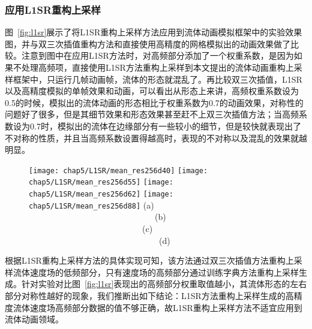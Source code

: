 \subsubsection{应用L1SR重构上采样}

图~\ref{fig:l1sr}展示了将L1SR重构上采样方法应用到流体动画模拟框架中的实验效果图，并与双三次插值重构方法和直接使用高精度的网格模拟出的动画效果做了比较。注意到图中在应用L1SR方法时，对高频部分添加了一个权重系数，是因为如果不处理高频项，直接使用L1SR方法重构上采样到本文提出的流体动画重构上采样框架中，只运行几帧动画帧，流体的形态就混乱了。再比较双三次插值，L1SR以及高精度模拟的单帧效果和动画，可以看出从形态上来讲，高频权重系数设为0.5的时候，模拟出的流体动画的形态相比于权重系数为0.7的动画效果，对称性的问题好了很多，但是其细节效果和形态效果甚至赶不上双三次插值方法；当高频系数设为0.7时，模拟出的流体在边缘部分有一些较小的细节，但是较快就表现出了不对称的性质，并且当高频系数设置得越高时，表现的不对称以及混乱的效果就越明显。

\begin{figure}[!ht]
  \centering
  \texttt{[image: chap5/L1SR/mean\_res256d40]}
  \hspace{0.1cm}
  \texttt{[image: chap5/L1SR/mean\_res256d55]}
   \hspace{0.1cm}
  \texttt{[image: chap5/L1SR/mean\_res256d62]}
   \hspace{0.1cm}
  \texttt{[image: chap5/L1SR/mean\_res256d88]}
   \newline  (a) \ \ \ \ \ \ \ \ \ \ \ \ \ \ \ \ \ \ \ \ \ \ \ \ \ \ \ \ \ \ (b) \ \ \ \ \ \ \ \ \ \ \ \ \ \ \ \ \ \ \ \ \ \ \ \ \ \ \ (c) \ \ \ \ \ \ \ \ \ \ \ \ \ \ \ \ \ \ \ \ \ \ \ \ \ \ \ \ \ \ \ (d)
\end{figure}

根据L1SR重构上采样方法的具体实现可知，该方法通过双三次插值方法重构上采样流体速度场的低频部分，只有速度场的高频部分通过训练字典方法重构上采样生成。针对实验对比图~\ref{fig:l1sr}表现出的高频部分权重取值越小，其流体形态的左右部分对称性越好的现象，我们推断出如下结论：L1SR方法重构上采样生成的高精度流体速度场高频部分数据的值不够正确，故L1SR重构上采样方法不适宜应用到流体动画领域。

